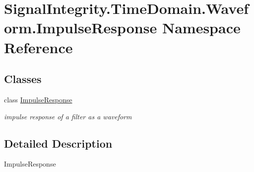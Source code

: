 \hypertarget{namespaceSignalIntegrity_1_1TimeDomain_1_1Waveform_1_1ImpulseResponse}{}\section{Signal\+Integrity.\+Time\+Domain.\+Waveform.\+Impulse\+Response Namespace Reference}
\label{namespaceSignalIntegrity_1_1TimeDomain_1_1Waveform_1_1ImpulseResponse}
\subsection*{Classes}
\begin{DoxyCompactItemize}
\item 
class \hyperlink{classSignalIntegrity_1_1TimeDomain_1_1Waveform_1_1ImpulseResponse_1_1ImpulseResponse}{Impulse\+Response}
\begin{DoxyCompactList}\small\item\em impulse response of a filter as a waveform \end{DoxyCompactList}\end{DoxyCompactItemize}


\subsection{Detailed Description}
\begin{DoxyVerb}ImpulseResponse\end{DoxyVerb}
 